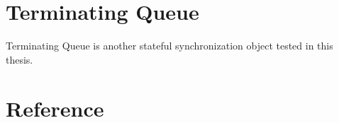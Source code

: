 \documentclass{article}
\begin{document}
\section{Terminating Queue}
Terminating Queue is another stateful synchronization object tested in this thesis.

\section{Reference}


\end{document}
